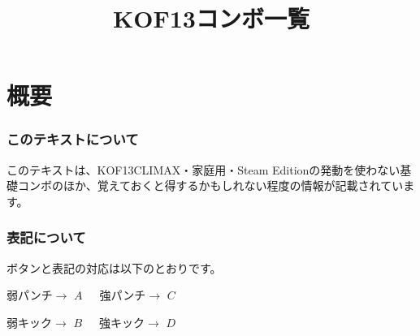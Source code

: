 \documentclass[a4j,11pt]{jarticle}
\title{KOF13コンボ一覧}
\author{}
\begin{document}
\maketitle
\thispagestyle{empty}
\tableofcontents %
\newpage
\part{概要}
\section{このテキストについて}
このテキストは、KOF13CLIMAX・家庭用・Steam
Editionの発動を使わない基礎コンボのほか、覚えておくと得するかもしれない程度の情報が記載されています。

\section{表記について}
ボタンと表記の対応は以下のとおりです。

\begin{screen}

 弱パンチ$\rightarrow$ $A$\ \ \ 強パンチ$\rightarrow$ $C$
 
 弱キック$\rightarrow$ $B$\ \ \ 強キック$\rightarrow$ $D$
\end{screen}
\vspace{11pt}
\end{document}
